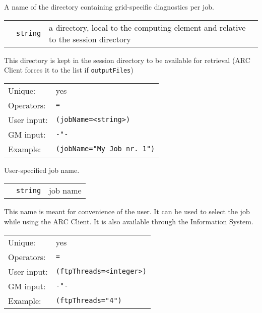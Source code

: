   A name of the directory containing grid-specific diagnostics per job.

  \begin{tabular}{llp{10cm}}
    \hspace*{1cm}&\texttt{string} & a directory, local to the computing element and
    relative to the session directory\\
  \end{tabular}

	This directory is kept in the session directory to be
	available for retrieval (ARC Client forces it to the list if
	\texttt{outputFiles})

  \hspace*{0.5cm}
  \begin{shaded}
  \end{shaded}
  \begin{tabular}{lp{13cm}}
    Unique:&yes\\
    Operators:&\verb#=#\\
    User input:&\verb#(jobName=<string>)#\\
    GM input:&\verb#-"-#\\
    Example:&\verb#(jobName="My Job nr. 1")#\\
  \end{tabular}

  User-specified job name.

  \begin{tabular}{llp{10cm}}
    \hspace*{1cm}&\texttt{string} & job name\\
  \end{tabular}

  This name is meant for convenience of the user. It can be used to
  select the job while using the ARC Client. It is also available through the
  Information System.

  \hspace*{0.5cm}
  \begin{shaded}
  \end{shaded}
  \begin{tabular}{lp{13cm}}
    Unique:&yes\\
    Operators:&\verb#=#\\
    User input:&\verb#(ftpThreads=<integer>)#\\
    GM input:&\verb#-"-#\\
    Example:&\verb#(ftpThreads="4")#\\
  \end{tabular}

